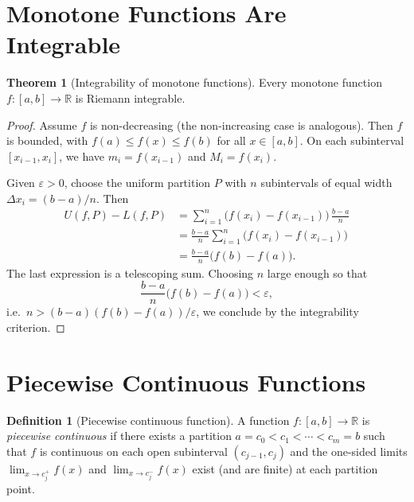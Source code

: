\documentclass[12pt,a4paper]{book}
\theoremstyle{definition}
\newtheorem{definition}{Definition}[chapter]
\newtheorem{theorem}{Theorem}[chapter]
\newcommand{\R}{\mathbb{R}}
\newcommand{\eps}{\varepsilon}
\begin{document}
\section{Monotone Functions Are Integrable}\label{sec:mono-integrable}

\begin{theorem}[Integrability of monotone functions]\label{thm:mono-integrable}
  Every monotone function $f\colon[a,b]\to\R$ is Riemann integrable.
\end{theorem}

\begin{proof}
  Assume $f$ is non-decreasing (the non-increasing case is analogous).
  Then $f$ is bounded, with $f(a)\le f(x)\le f(b)$ for all $x\in[a,b]$.
  On each subinterval $[x_{i-1},x_i]$, we have
  $m_i=f(x_{i-1})$ and $M_i=f(x_i)$.

  Given $\eps>0$, choose the uniform partition $P$ with $n$ subintervals
  of equal width $\Delta x_i=(b-a)/n$.  Then
  \begin{align*}
    U(f,P)-L(f,P)
    &= \sum_{i=1}^n \bigl(f(x_i)-f(x_{i-1})\bigr)\,\frac{b-a}{n} \\
    &= \frac{b-a}{n}\sum_{i=1}^n \bigl(f(x_i)-f(x_{i-1})\bigr) \\
    &= \frac{b-a}{n}\bigl(f(b)-f(a)\bigr).
  \end{align*}
  The last expression is a telescoping sum.  Choosing $n$ large enough so
  that
  \[
    \frac{b-a}{n}\bigl(f(b)-f(a)\bigr) < \eps,
  \]
  i.e.\ $n > (b-a)(f(b)-f(a))/\eps$, we conclude by the integrability
  criterion.
\end{proof}


\section{Piecewise Continuous Functions}\label{sec:piecewise}

\begin{definition}[Piecewise continuous function]\label{def:piecewise}
  A function $f\colon[a,b]\to\R$ is \emph{piecewise continuous} if there
  exists a partition $a=c_0<c_1<\cdots<c_m=b$ such that $f$ is
  continuous on each open subinterval $(c_{j-1},c_j)$ and the one-sided
  limits $\lim_{x\to c_j^+}f(x)$ and $\lim_{x\to c_j^-}f(x)$ exist
  (and are finite) at each partition point.
\end{definition}
\end{document}
